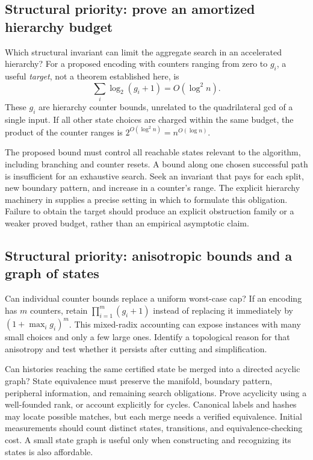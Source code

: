 \subsection{Structural priority: prove an amortized hierarchy budget}

Which structural invariant can limit the aggregate search in an accelerated
hierarchy? For a proposed encoding with counters ranging from zero to $g_i$,
a useful \emph{target}, not a theorem established here, is
\[
                 \sum_i\log_2(g_i+1)=O(\log^2 n).
\]
These $g_i$ are hierarchy counter bounds, unrelated to the quadrilateral gcd
of a single input. If all other state choices are charged within the same
budget, the product of the counter ranges is
$2^{O(\log^2 n)}=n^{O(\log n)}$.

The proposed bound must control all reachable states relevant to the
algorithm, including branching and counter resets. A bound along one chosen
successful path is insufficient for an exhaustive search. Seek an invariant
that pays for each split, new boundary pattern, and increase in a counter's
range. The explicit hierarchy machinery in \cite{Lackenby2026} supplies a
precise setting in which to formulate this obligation. Failure to obtain the
target should produce an explicit obstruction family or a weaker proved
budget, rather than an empirical asymptotic claim.

\subsection{Structural priority: anisotropic bounds and a graph of states}

Can individual counter bounds replace a uniform worst-case cap? If an
encoding has $m$ counters, retain $\prod_{i=1}^{m}(g_i+1)$ instead of replacing
it immediately by $(1+\max_i g_i)^m$. This mixed-radix accounting can expose
instances with many small choices and only a few large ones. Identify a
topological reason for that anisotropy and test whether it persists after
cutting and simplification.

Can histories reaching the same certified state be merged into a directed
acyclic graph? State equivalence must preserve the manifold, boundary
pattern, peripheral information, and remaining search obligations. Prove
acyclicity using a well-founded rank, or account explicitly for cycles.
Canonical labels and hashes may locate possible matches, but each merge
needs a verified equivalence. Initial measurements should count distinct
states, transitions, and equivalence-checking cost. A small state graph is
useful only when constructing and recognizing its states is also affordable.


